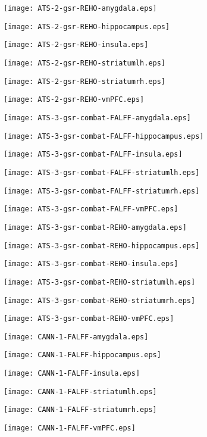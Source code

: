 \documentclass{article}
\begin{document}

\newpage
\texttt{[image: ATS-2-gsr-REHO-amygdala.eps]}

\newpage
\texttt{[image: ATS-2-gsr-REHO-hippocampus.eps]}

\newpage
\texttt{[image: ATS-2-gsr-REHO-insula.eps]}

\newpage
\texttt{[image: ATS-2-gsr-REHO-striatumlh.eps]}

\newpage
\texttt{[image: ATS-2-gsr-REHO-striatumrh.eps]}

\newpage
\texttt{[image: ATS-2-gsr-REHO-vmPFC.eps]}

\newpage
\texttt{[image: ATS-3-gsr-combat-FALFF-amygdala.eps]}

\newpage
\texttt{[image: ATS-3-gsr-combat-FALFF-hippocampus.eps]}

\newpage
\texttt{[image: ATS-3-gsr-combat-FALFF-insula.eps]}

\newpage
\texttt{[image: ATS-3-gsr-combat-FALFF-striatumlh.eps]}

\newpage
\texttt{[image: ATS-3-gsr-combat-FALFF-striatumrh.eps]}

\newpage
\texttt{[image: ATS-3-gsr-combat-FALFF-vmPFC.eps]}

\newpage
\texttt{[image: ATS-3-gsr-combat-REHO-amygdala.eps]}

\newpage
\texttt{[image: ATS-3-gsr-combat-REHO-hippocampus.eps]}

\newpage
\texttt{[image: ATS-3-gsr-combat-REHO-insula.eps]}

\newpage
\texttt{[image: ATS-3-gsr-combat-REHO-striatumlh.eps]}

\newpage
\texttt{[image: ATS-3-gsr-combat-REHO-striatumrh.eps]}

\newpage
\texttt{[image: ATS-3-gsr-combat-REHO-vmPFC.eps]}

\newpage
\texttt{[image: CANN-1-FALFF-amygdala.eps]}

\newpage
\texttt{[image: CANN-1-FALFF-hippocampus.eps]}

\newpage
\texttt{[image: CANN-1-FALFF-insula.eps]}

\newpage
\texttt{[image: CANN-1-FALFF-striatumlh.eps]}

\newpage
\texttt{[image: CANN-1-FALFF-striatumrh.eps]}

\newpage
\texttt{[image: CANN-1-FALFF-vmPFC.eps]}
\end{document}
